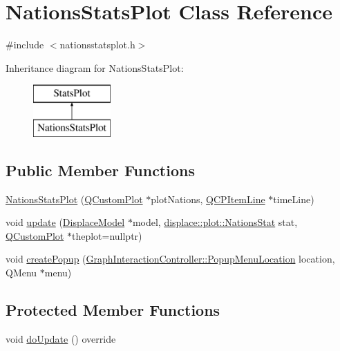 \hypertarget{class_nations_stats_plot}{}\section{Nations\+Stats\+Plot Class Reference}
\label{class_nations_stats_plot}


{\ttfamily \#include $<$nationsstatsplot.\+h$>$}

Inheritance diagram for Nations\+Stats\+Plot\+:\begin{figure}[H]
\begin{center}
\leavevmode
\includegraphics[height=2.000000cm]{da/d7d/class_nations_stats_plot}
\end{center}
\end{figure}
\subsection*{Public Member Functions}
\begin{DoxyCompactItemize}
\item 
\mbox{\hyperlink{class_nations_stats_plot_a5dca577eebb1e30ca19c81c2d68a3c5b}{Nations\+Stats\+Plot}} (\mbox{\hyperlink{class_q_custom_plot}{Q\+Custom\+Plot}} $\ast$plot\+Nations, \mbox{\hyperlink{class_q_c_p_item_line}{Q\+C\+P\+Item\+Line}} $\ast$time\+Line)
\item 
void \mbox{\hyperlink{class_nations_stats_plot_ab4ac247ed98a4ea9e61b9d465ae586dd}{update}} (\mbox{\hyperlink{class_displace_model}{Displace\+Model}} $\ast$model, \mbox{\hyperlink{namespacedisplace_1_1plot_ab7b96ae3ae291a71823f371d77f27d98}{displace\+::plot\+::\+Nations\+Stat}} stat, \mbox{\hyperlink{class_q_custom_plot}{Q\+Custom\+Plot}} $\ast$theplot=nullptr)
\item 
void \mbox{\hyperlink{class_nations_stats_plot_afc653896a7282fe0fdcb36e064c9155d}{create\+Popup}} (\mbox{\hyperlink{class_graph_interaction_controller_a67e6eba082927bf2b984bed54fe32764}{Graph\+Interaction\+Controller\+::\+Popup\+Menu\+Location}} location, Q\+Menu $\ast$menu)
\end{DoxyCompactItemize}
\subsection*{Protected Member Functions}
\begin{DoxyCompactItemize}
\item 
void \mbox{\hyperlink{class_nations_stats_plot_aee0dd7349472d05b13e5f4916380e117}{do\+Update}} () override
\end{DoxyCompactItemize}



